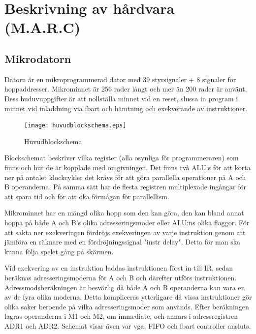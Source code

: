 \documentclass[11pt]{article}
\begin{document}
\newpage


\section{Beskrivning av hårdvara (M.A.R.C)}

\subsection{Mikrodatorn}

Datorn är en mikroprogrammerad dator med 39 styrsignaler + 8 signaler för hoppaddresser. Mikrominnet är 256 rader långt och mer än 200 rader är använt. Dess huduvuppgifter är att nollställa minnet vid en reset, slussa in program i minnet vid inladdning via fbart och hämtning och exekverande av instruktioner.

\begin{figure}[h]
    \begin{center}
        \texttt{[image: huvudblockschema.eps]}
        \caption{Huvudblockschema}
        \label{fig:huvud}
    \end{center}
\end{figure}

Blockschemat beskriver vilka register (alla osynliga för programmeraren) som finns och hur de är kopplade med omgivningen. Det finns två ALU:s för att korta ner på antalet klockcykler det krävs för att göra parallella operationer på A och B operanderna. På samma sätt har de flesta registren multiplexade ingångar för att spara tid och för att öka förmågan för parallellism.

Mikrominnet har en mängd olika hopp som den kan göra, den kan bland annat hoppa på både A och B's olika adresseringsmoder eller ALU:ns olika flaggor. För att sakta ner exekveringen fördröjs exekveringen av varje instruktion genom att jämföra en räknare med en fördröjningssignal "instr delay". Detta för man ska kunna följa spelet gång på skärmen.

Vid exekvering av en instruktion laddas instruktionen först in till IR, sedan beräknas adresseringsmoderna för A och B och därefter utförs instruktionen. Adressmodsberäkningen är besvärlig då både A och B operanderna kan vara en av de fyra olika moderna. Detta kompliceras ytterligare då vissa instruktioner gör olika saker beroende på vilka adresseringsmoder som används. Efter beräkningen lagras operanderna i M1 och M2, om immediate, och annars i adressregistren ADR1 och ADR2. Schemat visar även var vga, FIFO och fbart controller ansluts.
\end{document}
